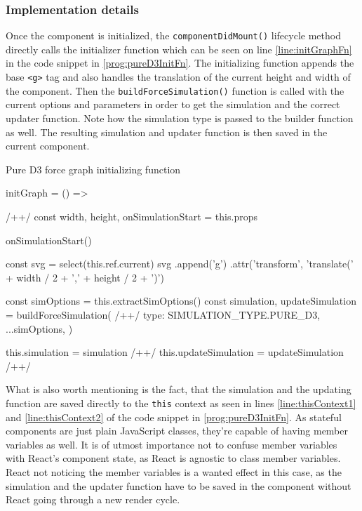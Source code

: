 \subsubsection{Implementation details}

Once the component is initialized, the \texttt{componentDidMount()} lifecycle method directly calls the initializer function which can be seen on line \ref{line:initGraphFn} in the code snippet in \ref{prog:pureD3InitFn}. The initializing function appends the base \texttt{<g>} tag and also handles the translation of the current height and width of the component. Then the \texttt{buildForceSimulation()} function is called with the current options and parameters in order to get the simulation and the correct updater function. Note how the simulation type is passed to the builder function as well. The resulting simulation and updater function is then saved in the current component.

\begin{program}
\caption{Pure D3 force graph initializing function}
\label{prog:pureD3InitFn}
\begin{JsCode}
initGraph = () => { /+\label{line:initGraphFn}+/
  const { width, height, onSimulationStart } = this.props

  onSimulationStart()

  const svg = select(this.ref.current)
  svg
    .append('g')
    .attr('transform', 'translate(' + width / 2 + ',' + height / 2 + ')')

  const simOptions = this.extractSimOptions()
  const { simulation, updateSimulation } = buildForceSimulation({ /+\label{line:buildForceSimulation}+/
    type: SIMULATION_TYPE.PURE_D3,
    ...simOptions,
  })

  this.simulation = simulation /+\label{line:thisContext1}+/
  this.updateSimulation = updateSimulation /+\label{line:thisContext2}+/
}
\end{JsCode}
\end{program}

What is also worth mentioning is the fact, that the simulation and the updating function are saved directly to the \texttt{this} context as seen in lines \ref{line:thisContext1} and \ref{line:thisContext2} of the code snippet in \ref{prog:pureD3InitFn}. As stateful components are just plain JavaScript classes, they're capable of having member variables as well. It is of utmost importance not to confuse member variables with React's component state, as React is agnostic to class member variables. React not noticing the member variables is a wanted effect in this case, as the simulation and the updater function have to be saved in the component without React going through a new render cycle. 

